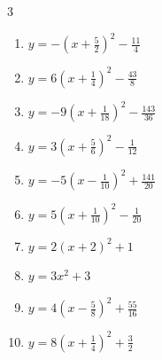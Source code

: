 \begin{multicols}{3}
\begin{enumerate}

  \item $\displaystyle y=-\left( x+\frac{5}{2}\right)^{2}-\frac{11}{4}$


  \item $\displaystyle y=6\left( x+\frac{1}{4}\right)^{2}-\frac{43}{8}$


  \item $\displaystyle y=-9\left( x+\frac{1}{18}\right)^{2}-\frac{143}{36}$


  \item $\displaystyle y=3\left( x+\frac{5}{6}\right)^{2}-\frac{1}{12}$


  \item $\displaystyle y=-5\left( x-\frac{1}{10}\right)^{2}+\frac{141}{20}$


  \item $\displaystyle y=5\left( x+\frac{1}{10}\right)^{2}-\frac{1}{20}$


\columnbreak %

  \item $\displaystyle y=2\left( x+2\right)^{2}+1$

        \phantom{$\displaystyle 頂点\left( -2 , 1 \right)$}

  \item $\displaystyle y=3x^{2}+3$

        \phantom{$\displaystyle 頂点\left( 0 , 3 \right)$}

  \item $\displaystyle y=4\left( x-\frac{5}{8}\right)^{2}+\frac{55}{16}$


  \item $\displaystyle y=8\left( x+\frac{1}{4}\right)^{2}+\frac{3}{2}$


\end{enumerate}
\end{multicols}
